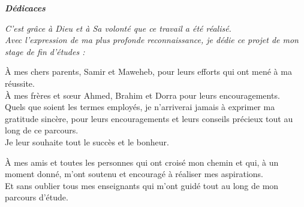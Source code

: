 \documentclass[12pt,a4paper]{report}
\begin{document}
\clearpage
{}

\clearpage
{}
\begin{center}
    \vspace*{1.5cm}
    {\Huge\color{fsegsblue}\textbf{\textit{Dédicaces}}}
    \vspace{1.5cm}
    
    \large\itshape
    C'est grâce à Dieu et à Sa volonté que ce travail a été réalisé.\\
    Avec l'expression de ma plus profonde reconnaissance, je dédie ce projet de mon stage de fin d'études :
    
    \vspace{1.2cm}
    
    À mes chers parents, Samir et Maweheb, pour leurs efforts qui ont mené à ma réussite.\\
    À mes frères et sœur Ahmed, Brahim et Dorra pour leurs encouragements.\\
    Quels que soient les termes employés, je n'arriverai jamais à exprimer ma gratitude sincère, pour leurs encouragements et leurs conseils précieux tout au long de ce parcours.\\
    Je leur souhaite tout le succès et le bonheur.
    
    \vspace{1.2cm}
    
    À mes amis et toutes les personnes qui ont croisé mon chemin et qui, à un moment donné, m'ont soutenu et encouragé à réaliser mes aspirations.\\
    Et sans oublier tous mes enseignants qui m'ont guidé tout au long de mon parcours d'étude.
\end{center}

\clearpage
\end{document}
